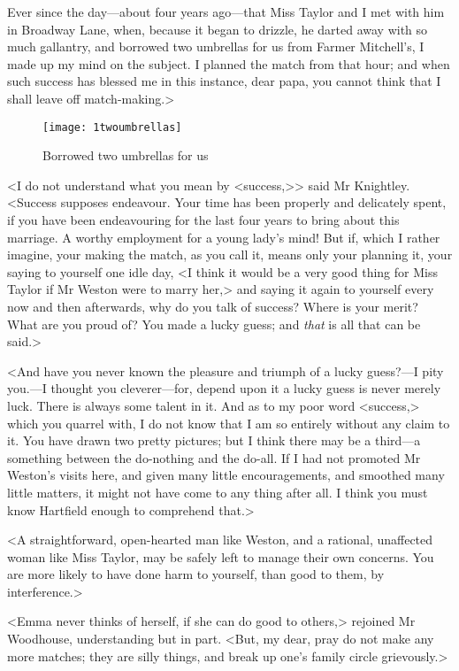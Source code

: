 Ever since the day—about four years ago—that Miss Taylor and I met with him in Broadway Lane, when, because it began to drizzle, he darted away with so much gallantry, and borrowed two umbrellas for us from Farmer Mitchell's, I made up my mind on the subject. I planned the match from that hour; and when such success has blessed me in this instance, dear papa, you cannot think that I shall leave off match-making.>

\begin{figure}[tbph]
\centering
\texttt{[image: 1twoumbrellas]}
\caption{Borrowed two umbrellas for us}
\end{figure}

<I do not understand what you mean by <success,>> said Mr Knightley. <Success supposes endeavour. Your time has been properly and delicately spent, if you have been endeavouring for the last four years to bring about this marriage. A worthy employment for a young lady's mind! But if, which I rather imagine, your making the match, as you call it, means only your planning it, your saying to yourself one idle day, <I think it would be a very good thing for Miss Taylor if Mr Weston were to marry her,> and saying it again to yourself every now and then afterwards, why do you talk of success? Where is your merit? What are you proud of? You made a lucky guess; and \textit{that} is all that can be said.>

<And have you never known the pleasure and triumph of a lucky guess?—I pity you.—I thought you cleverer—for, depend upon it a lucky guess is never merely luck. There is always some talent in it. And as to my poor word <success,> which you quarrel with, I do not know that I am so entirely without any claim to it. You have drawn two pretty pictures; but I think there may be a third—a something between the do-nothing and the do-all. If I had not promoted Mr Weston's visits here, and given many little encouragements, and smoothed many little matters, it might not have come to any thing after all. I think you must know Hartfield enough to comprehend that.>

<A straightforward, open-hearted man like Weston, and a rational, unaffected woman like Miss Taylor, may be safely left to manage their own concerns. You are more likely to have done harm to yourself, than good to them, by interference.>

<Emma never thinks of herself, if she can do good to others,> rejoined Mr Woodhouse, understanding but in part. <But, my dear, pray do not make any more matches; they are silly things, and break up one's family circle grievously.>

